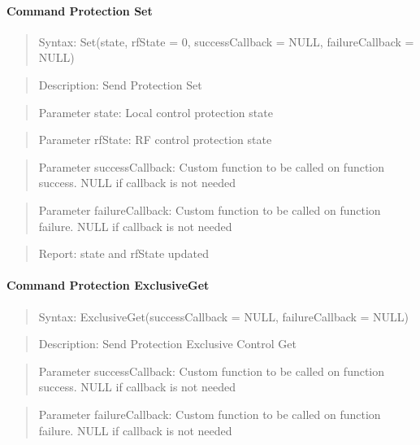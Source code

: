 \paragraph{Command Protection Set}
\begin{quote}Syntax: Set(state, rfState = 0, successCallback = NULL, failureCallback = NULL)\end{quote}
\begin{quote}Description: Send Protection Set\end{quote}
\begin{quote}Parameter state: Local control protection state\end{quote}
\begin{quote}Parameter rfState: RF control protection state\end{quote}
\begin{quote}Parameter successCallback: Custom function to be called on function success. NULL if callback is not needed\end{quote}
\begin{quote}Parameter failureCallback: Custom function to be called on function failure. NULL if callback is not needed\end{quote}
\begin{quote}Report: state and rfState updated\end{quote}

\paragraph{Command Protection ExclusiveGet}
\begin{quote}Syntax: ExclusiveGet(successCallback = NULL, failureCallback = NULL)\end{quote}
\begin{quote}Description: Send Protection Exclusive Control Get\end{quote}
\begin{quote}Parameter successCallback: Custom function to be called on function success. NULL if callback is not needed\end{quote}
\begin{quote}Parameter failureCallback: Custom function to be called on function failure. NULL if callback is not needed\end{quote}


